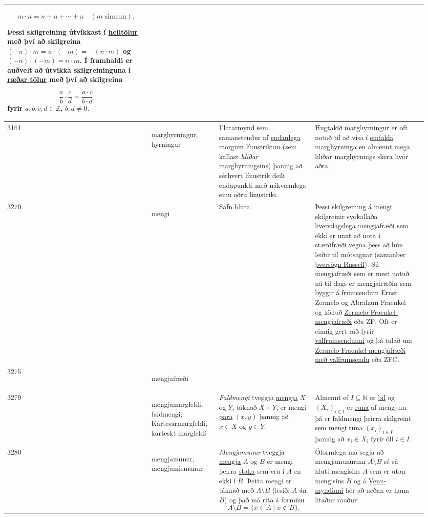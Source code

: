 \begin{longtable}{p{} | p{} | p{} | p{} | p{}}
\[ m \cdot n = n + n + \cdots + n \quad (\text{\(m\) sinnum}). \] 

Þessi skilgreining útvíkkast í \hyperlink{row:1896}{heiltölur} með því að skilgreina \((-n)\cdot m = n\cdot (-m) = -(n \cdot m)\) og \((-n)\cdot (-m)=n\cdot m\). Í framhaldi er auðvelt að útvikka skilgreininguna í \hyperlink{row:4039}{ræðar tölur} með því að skilgreina

\[ \frac{a}{b} \cdot \frac{c}{d} = \frac{a\cdot c}{b \cdot d} \] fyrir \(a,b,c,d \in \mathbb{Z}\), \(b,d\neq0\). &  &  \\
\hline
3161 & \hypertarget{row:3161}{marghyrningur, hyrningur} & \hyperlink{row:4891}{Flatarmynd} sem samanstendur af \hyperlink{row:1009}{endanlega} mörgum \hyperlink{row:2958}{línustrikum} (sem kallast \textit{hliðar} marghyrningsins) þannig að sérhvert línustrik deili endapunkti með nákvæmlega einu öðru línustriki. & Hugtakið marghyrningur er oft notað til að vísa í \hyperlink{row:832}{einfalda marghyrninga} en almennt mega hliðar marghyrnings skera hvor aðra. &  \\
\hline
3270 & \hypertarget{row:3270}{mengi} & Safn \hyperlink{row:5114}{hluta}. & Þessi skilgreining á mengi skilgreinir svokallaða \hyperlink{row:2337}{hversdagslega mengjafræði} sem ekki er unnt að nota í stærðfræði vegna þess að hún leiðir til mótsagnar (samanber \hyperlink{row:4294}{þversögn Russell}). Sú mengjafræði sem er mest notuð nú til dags er mengjafræðin sem byggir á frumsendum Ernst Zermelo og Abraham Fraenkel og kölluð \hyperlink{row:6314}{Zermelo-Fraenkel-mengjafræði} eða ZF. Oft er einnig gert ráð fyrir \hyperlink{row:5954}{valfrumsendunni} og þá talað um \hyperlink{row:6315}{Zermelo-Fraenkel-mengjafræði með valfrumsendu} eða ZFC. &  \\
\hline
3275 & \hypertarget{row:3275}{mengjafræði} &  &  &  \\
\hline
3279 & \hypertarget{row:3279}{mengjamargfeldi, faldmengi, Kartesarmargfeldi, karteskt margfeldi} & \textit{Faldmengi} tveggja \hyperlink{row:3270}{mengja} \(X\) og \(Y\), táknað \(X \times Y\), er mengi \hyperlink{row:5627}{para} \((x,y)\) þannig að \(x \in X\) og \(y \in Y\). & Almennt ef \(I \subseteq \mathbb{N}\) er \hyperlink{row:457}{bil} og \(\left(X_i\right)_{i \in I}\) er \hyperlink{row:3684}{runa} af mengjum þá er faldmengi þeirra skilgreint sem mengi runa \((x_i)_{i \in I}\) þannig að \(x_i \in X_i\) fyrir öll \(i \in I\). &  \\
\hline
3280 & \hypertarget{row:3280}{mengjamunur, mengjamismunur} & \textit{Mengjamunur} tveggja \hyperlink{row:3270}{mengja} \(A\) og \(B\) er mengi þeirra \hyperlink{row:5128}{staka} sem eru í \(A\) en ekki í \(B\). Þetta mengi er táknað með \(A \setminus B\) (lesið: \(A\) án \(B\)) og það má rita á forminu \[ A \setminus B = \{x \in A \mid x \notin B\}. \] & Óformlega má segja að mengjamunurinn \(A \setminus B\) sé sá hluti mengisins \(A\) sem er utan mengisins \(B\) og á \hyperlink{row:6050}{Venn-myndinni} hér að neðan er hann litaður rauður:


\end{longtable}
